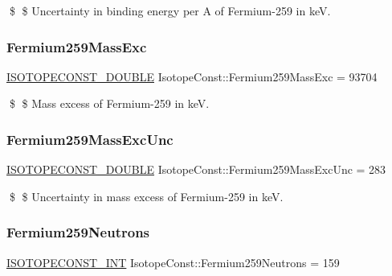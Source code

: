 \$ \$ Uncertainty in binding energy per A of Fermium-\/259 in keV. \mbox{\label{group___isotope_const-_fermium-_fm259_ga62f60febe73625cb02599876070e8470}} 
\subsubsection{\texorpdfstring{Fermium259\+Mass\+Exc}{Fermium259MassExc}}
{\footnotesize\ttfamily \mbox{\hyperlink{group___isotope_const-_macros_ga8f45a7272ce02c0b4c65c44636ed719a}{I\+S\+O\+T\+O\+P\+E\+C\+O\+N\+S\+T\+\_\+\+D\+O\+U\+B\+LE}} Isotope\+Const\+::\+Fermium259\+Mass\+Exc = 93704}

\$ \$ Mass excess of Fermium-\/259 in keV. \mbox{\label{group___isotope_const-_fermium-_fm259_ga0119e4c7d76058c944bcc3b1b975da7f}} 
\subsubsection{\texorpdfstring{Fermium259\+Mass\+Exc\+Unc}{Fermium259MassExcUnc}}
{\footnotesize\ttfamily \mbox{\hyperlink{group___isotope_const-_macros_ga8f45a7272ce02c0b4c65c44636ed719a}{I\+S\+O\+T\+O\+P\+E\+C\+O\+N\+S\+T\+\_\+\+D\+O\+U\+B\+LE}} Isotope\+Const\+::\+Fermium259\+Mass\+Exc\+Unc = 283}

\$ \$ Uncertainty in mass excess of Fermium-\/259 in keV. \mbox{\label{group___isotope_const-_fermium-_fm259_ga2395756e376e4eb83fa1187eedbd99f1}} 
\subsubsection{\texorpdfstring{Fermium259\+Neutrons}{Fermium259Neutrons}}
{\footnotesize\ttfamily \mbox{\hyperlink{group___isotope_const-_macros_ga5f18360b3e99483a35c32d789e62621c}{I\+S\+O\+T\+O\+P\+E\+C\+O\+N\+S\+T\+\_\+\+I\+NT}} Isotope\+Const\+::\+Fermium259\+Neutrons = 159}


